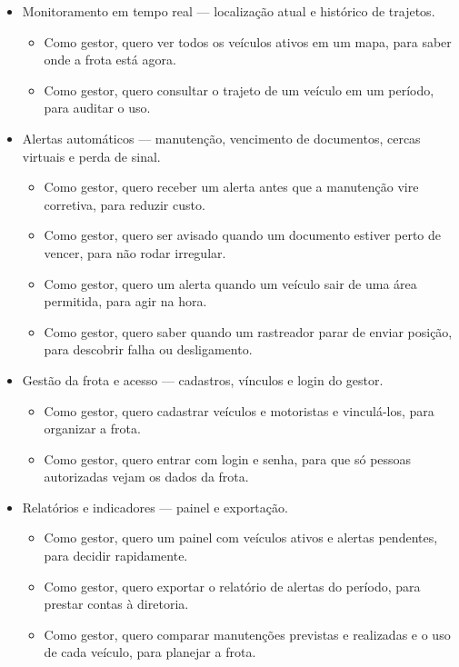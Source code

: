 \documentclass[11pt,a4paper]{article}
\begin{document}
\begin{itemize}[itemsep=4pt]
  \item[\textbf{E1}] Monitoramento em tempo real --- localização atual e histórico de trajetos.
  \begin{itemize}
    \item Como gestor, quero ver todos os veículos ativos em um mapa, para saber onde a frota está agora.
    \item Como gestor, quero consultar o trajeto de um veículo em um período, para auditar o uso.
  \end{itemize}
  \item[\textbf{E2}] Alertas automáticos --- manutenção, vencimento de documentos, cercas virtuais e perda de sinal.
  \begin{itemize}
    \item Como gestor, quero receber um alerta antes que a manutenção vire corretiva, para reduzir custo.
    \item Como gestor, quero ser avisado quando um documento estiver perto de vencer, para não rodar irregular.
    \item Como gestor, quero um alerta quando um veículo sair de uma área permitida, para agir na hora.
    \item Como gestor, quero saber quando um rastreador parar de enviar posição, para descobrir falha ou desligamento.
  \end{itemize}
  \item[\textbf{E3}] Gestão da frota e acesso --- cadastros, vínculos e login do gestor.
  \begin{itemize}
    \item Como gestor, quero cadastrar veículos e motoristas e vinculá-los, para organizar a frota.
    \item Como gestor, quero entrar com login e senha, para que só pessoas autorizadas vejam os dados da frota.
  \end{itemize}
  \item[\textbf{E4}] Relatórios e indicadores --- painel e exportação.
  \begin{itemize}
    \item Como gestor, quero um painel com veículos ativos e alertas pendentes, para decidir rapidamente.
    \item Como gestor, quero exportar o relatório de alertas do período, para prestar contas à diretoria.
    \item Como gestor, quero comparar manutenções previstas e realizadas e o uso de cada veículo, para planejar a frota.
  \end{itemize}
\end{itemize}
\end{document}
